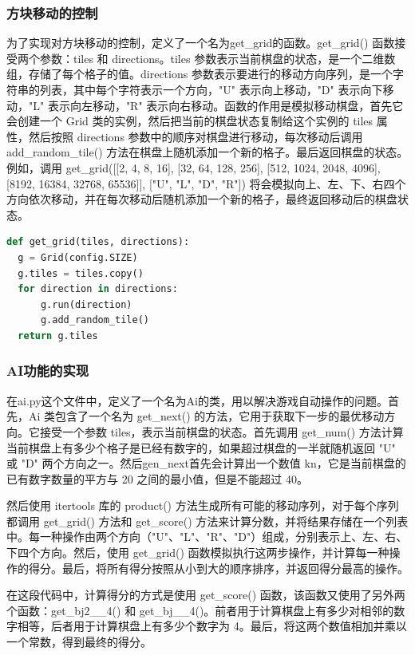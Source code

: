 \documentclass[UTF8,AutoFakeBold,AutoFakeSlant,zihao=-4]{ctexart}
\begin{document}
\subsubsection{方块移动的控制}
为了实现对方块移动的控制，定义了一个名为get\_grid的函数。get\_grid() 函数接受两个参数：tiles 和 directions。tiles 参数表示当前棋盘的状态，是一个二维数组，存储了每个格子的值。directions 参数表示要进行的移动方向序列，是一个字符串的列表，其中每个字符表示一个方向，"U" 表示向上移动，"D" 表示向下移动，"L" 表示向左移动，"R" 表示向右移动。函数的作用是模拟移动棋盘，首先它会创建一个 Grid 类的实例，然后把当前的棋盘状态复制给这个实例的 tiles 属性，然后按照 directions 参数中的顺序对棋盘进行移动，每次移动后调用 add\_random\_tile() 方法在棋盘上随机添加一个新的格子。最后返回棋盘的状态。例如，调用 get\_grid([[2, 4, 8, 16], [32, 64, 128, 256], [512, 1024, 2048, 4096], [8192, 16384, 32768, 65536]], ["U", "L", "D", "R"]) 将会模拟向上、左、下、右四个方向依次移动，并在每次移动后随机添加一个新的格子，最终返回移动后的棋盘状态。

\begin{lstlisting}[language=Python]
  def get_grid(tiles, directions):
  g = Grid(config.SIZE)
  g.tiles = tiles.copy()
  for direction in directions:
      g.run(direction)
      g.add_random_tile()
  return g.tiles

\end{lstlisting}

\subsubsection{AI功能的实现}
在ai.py这个文件中，定义了一个名为Ai的类，用以解决游戏自动操作的问题。首先，Ai 类包含了一个名为 get\_next() 的方法，它用于获取下一步的最优移动方向。它接受一个参数 tiles，表示当前棋盘的状态。首先调用 get\_num() 方法计算当前棋盘上有多少个格子是已经有数字的，如果超过棋盘的一半就随机返回 "U" 或 "D" 两个方向之一。然后gen\_next首先会计算出一个数值 kn，它是当前棋盘的已有数字数量的平方与 20 之间的最小值，但是不能超过 40。

然后使用 itertools 库的 product() 方法生成所有可能的移动序列，对于每个序列都调用 get\_grid() 方法和 get\_score() 方法来计算分数，并将结果存储在一个列表中。每一种操作由两个方向（"U"、"L"、"R"、"D"）组成，分别表示上、左、右、下四个方向。然后，使用 get\_grid() 函数模拟执行这两步操作，并计算每一种操作的得分。最后，将所有得分按照从小到大的顺序排序，并返回得分最高的操作。

在这段代码中，计算得分的方式是使用 get\_score() 函数，该函数又使用了另外两个函数：get\_bj2\_\_4() 和 get\_bj\_\_4()。前者用于计算棋盘上有多少对相邻的数字相等，后者用于计算棋盘上有多少个数字为 4。最后，将这两个数值相加并乘以一个常数，得到最终的得分。
\end{document}
